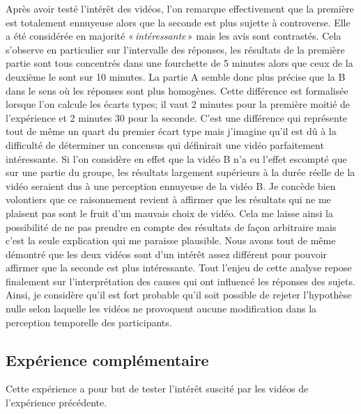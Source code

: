 \documentclass[12pt,fleqn,oneside,french,openany]{book} %
\begin{document}
Après avoir testé l'intérêt des vidéos, l'on remarque effectivement que la première est totalement ennuyeuse alors que la seconde est plus sujette à controverse. Elle a été considérée en majorité «\,\emph{intéressante}\,» mais les avis sont contrastés. Cela s'observe en particulier sur l'intervalle des réponses, les résultats de la première partie sont tous concentrés dans une fourchette de 5 minutes alors que ceux de la deuxième le sont sur 10 minutes. La partie A semble donc plus précise que la B dans le sens où les réponses sont plus homogènes. Cette différence est formalisée lorsque l'on calcule les écarts types; il vaut 2 minutes pour la première moitié de l'expérience et 2 minutes 30 pour la seconde. C'est une différence qui représente tout de même un quart du premier écart type mais j'imagine qu'il est dû à la difficulté de déterminer un concensus qui définirait une vidéo parfaitement intéressante. Si l'on considère en effet que la vidéo B n'a eu l'effet escompté que sur une partie du groupe, les résultats largement supérieurs à la durée réelle de la vidéo seraient dus à une perception ennuyeuse de la vidéo B. Je concède bien volontiers que ce raisonnement revient à affirmer que les résultats qui ne me plaisent pas sont le fruit d'un mauvais choix de vidéo. Cela me laisse ainsi la possibilité de ne pas prendre en compte des résultats de façon arbitraire mais c'est la seule explication qui me paraisse plausible. Nous avons tout de même démontré que les deux vidéos sont d'un intérêt assez différent pour pouvoir affirmer que la seconde est plus intéressante. Tout l'enjeu de cette analyse repose finalement sur l'interprétation des causes qui ont influencé les réponses des sujets. Ainsi, je considère qu'il est fort probable qu'il soit possible de rejeter l'hypothèse nulle selon laquelle les vidéos ne provoquent aucune modification dans la perception temporelle des participants.

\clearpage

\subsection{Expérience complémentaire} \label{ssec:exp1.2}
Cette expérience a pour but de tester l'intérêt suscité par les vidéos de l'expérience précédente. 
\end{document}
